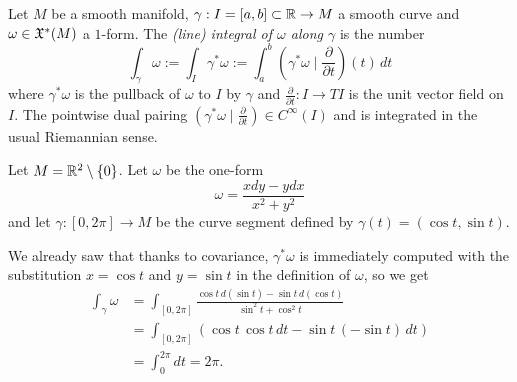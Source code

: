 \begin{definition}
  Let $M$ be a smooth manifold, $\gamma: I = [a,b]\subset \mathbb{R} \to M$ a smooth curve and $\omega\in\mathfrak{X}^*(M)$ a $1$-form.
  The \emph{(line) integral of $\omega$ along $\gamma$} is the number
  \begin{equation}
    \int_\gamma \omega :=
    \int_I \gamma^*\omega :=
    \int_a^b \left(\gamma^*\omega \mid \frac{\partial}{\partial t}\right)(t)\, dt
  \end{equation}
  where $\gamma^*\omega$ is the pullback of $\omega$ to $I$ by $\gamma$ and $\frac{\partial}{\partial t}: I \to TI$ is the unit vector field on $I$.
  The pointwise dual pairing $\left(\gamma^*\omega \mid \frac{\partial}{\partial t}\right)\in C^\infty(I)$ and is integrated in the usual Riemannian sense.
\end{definition}

\begin{example}\label{ex:li}
  Let $M=\mathbb{R}^2\setminus\{0\}$. Let $\omega$ be the one-form
  \begin{equation}
    \omega = \frac{x dy - y dx}{x^2 + y^2}
  \end{equation}
  and let $\gamma:[0,2\pi]\to M$ be the curve segment defined by $\gamma(t) = (\cos t, \sin t)$.

  We already saw that thanks to covariance, $\gamma^*\omega$ is immediately computed with the substitution $x=\cos t$ and $y=\sin t$ in the definition of $\omega$, so we get
  \begin{align}
    \int_\gamma \omega
     & = \int_{[0,2\pi]} \frac{\cos t\, d(\sin t) - \sin t \, d(\cos t)}{\sin^2 t + \cos^2 t} \\
     & = \int_{[0,2\pi]} (\cos t\, \cos t\, dt - \sin t \, (-\sin t)\, dt)                    \\
     & = \int_0^{2\pi} dt = 2\pi.
  \end{align}
\end{example}

